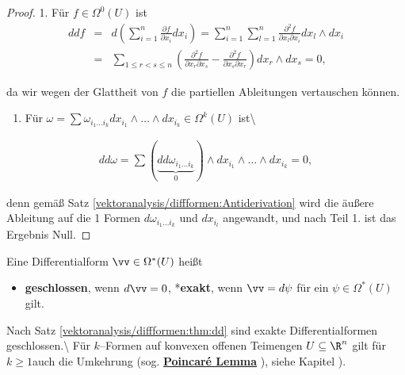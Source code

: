 \begin{proof}
 1. Für \(f\in\Omega^0(U)\) ist
\begin{align*}
ddf &=& d\left(\sum_{i=1}^n\frac{\partial f}
{\partial x_i}dx_i\right) = \sum_{i=1}^n\sum_{l=1}^n\frac{\partial^2f}{\partial x_l\partial x_i}
dx_l\wedge dx_i\\
& =& \sum_{1\leq r< s\leq n}\left(\frac{\partial^2 f}{\partial x_r
\partial x_s} - \frac{\partial^2f}{\partial x_s\partial x_r}\right)dx_r\wedge dx_s = 0,
\end{align*}
\par
da wir wegen der Glattheit von \(f\) die partiellen Ableitungen vertauschen
können.
\begin{enumerate}

\item {} 
\par
Für \(\omega = \sum\omega_{i_1\ldots i_k}dx_{i_1}\wedge\ldots\wedge dx_{i_k}
\in\Omega^k(U)\) ist\textbackslash{}

\end{enumerate}
\begin{align*}
dd\omega = \sum(\underbrace{dd\omega_{i_1\ldots i_k}}_0)
\wedge dx_{i_1}\wedge\ldots\wedge dx_{i_k} = 0,
\end{align*}
\par
denn gemäß Satz \cref{vektoranalysis/diffformen:Antiderivation} wird die äußere Ableitung auf die
1 Formen \(d\omega_{i_1\ldots i_k}\) und \(dx_{i_l}\) angewandt, und nach Teil 1.
ist das Ergebnis Null.
\end{proof}
\label{vektoranalysis/diffformen:geschlossen:exakt}
\begin{definition}{}{}



\par
Eine Differentialform \(\vv\in\Omega^*(U)\) heißt
\begin{itemize}
\item {} 
\par
\textbf{geschlossen}, wenn \(d\vv=0\), *\textbf{exakt}, wenn \(\vv=d\psi\) für ein \(\psi\in\Omega^*(U)\) gilt.

\end{itemize}

\par
Nach Satz \cref{vektoranalysis/diffformen:thm:dd} sind exakte Differentialformen geschlossen.\textbackslash{} Für \(k\)–Formen auf konvexen offenen Teimengen \(U\subseteq \R^n\) gilt für \(k\ge 1\)auch die Umkehrung (sog.
\href{https://de.wikipedia.org/wiki/Poincar\%c3\%a9-Lemma}{\textbf{Poincaré Lemma}} ),  siehe Kapitel ).
\end{definition}


